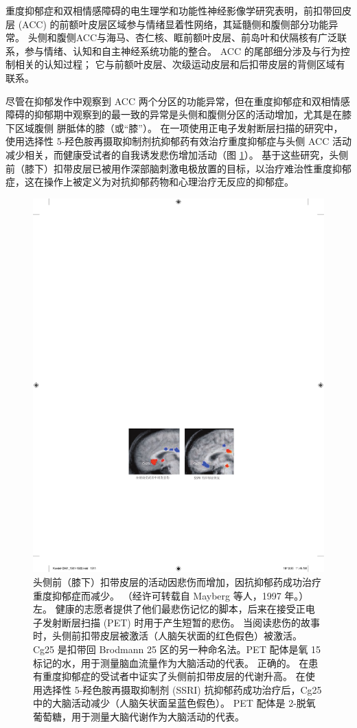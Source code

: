 重度抑郁症和双相情感障碍的电生理学和功能性神经影像学研究表明，前扣带回皮层 (ACC) 的前额叶皮层区域参与情绪显着性网络，其延髓侧和腹侧部分功能异常。 头侧和腹侧ACC与海马、杏仁核、眶前额叶皮层、前岛叶和伏隔核有广泛联系，参与情绪、认知和自主神经系统功能的整合。 ACC 的尾部细分涉及与行为控制相关的认知过程； 它与前额叶皮层、次级运动皮层和后扣带皮层的背侧区域有联系。

尽管在抑郁发作中观察到 ACC 两个分区的功能异常，但在重度抑郁症和双相情感障碍的抑郁期中观察到的最一致的异常是头侧和腹侧分区的活动增加，尤其是在膝下区域腹侧 胼胝体的膝（或“膝”）。 在一项使用正电子发射断层扫描的研究中，使用选择性 5-羟色胺再摄取抑制剂抗抑郁药有效治疗重度抑郁症与头侧 ACC 活动减少相关，而健康受试者的自我诱发悲伤增加活动（图 \ref{fig:61_4}）。 基于这些研究，头侧前（膝下）扣带皮层已被用作深部脑刺激电极放置的目标，以治疗难治性重度抑郁症，这在操作上被定义为对抗抑郁药物和心理治疗无反应的抑郁症。

\begin{figure}[htbp]
	\centering
	\includegraphics[width=0.6\linewidth]{chap61/fig_61_4}
	\caption{头侧前（膝下）扣带皮层的活动因悲伤而增加，因抗抑郁药成功治疗重度抑郁症而减少。 （经许可转载自 Mayberg 等人，1997 年。）左。 健康的志愿者提供了他们最悲伤记忆的脚本，后来在接受正电子发射断层扫描 (PET) 时用于产生短暂的悲伤。 当阅读悲伤的故事时，头侧前扣带皮层被激活（人脑矢状面的红色假色）被激活。 Cg25 是扣带回 Brodmann 25 区的另一种命名法。PET 配体是氧 15 标记的水，用于测量脑血流量作为大脑活动的代表。 正确的。 在患有重度抑郁症的受试者中证实了头侧前扣带皮层的代谢升高。 在使用选择性 5-羟色胺再摄取抑制剂 (SSRI) 抗抑郁药成功治疗后，Cg25 中的大脑活动减少（人脑矢状面呈蓝色假色）。 PET 配体是 2-脱氧葡萄糖，用于测量大脑代谢作为大脑活动的代表。}
	\label{fig:61_4}
\end{figure}

